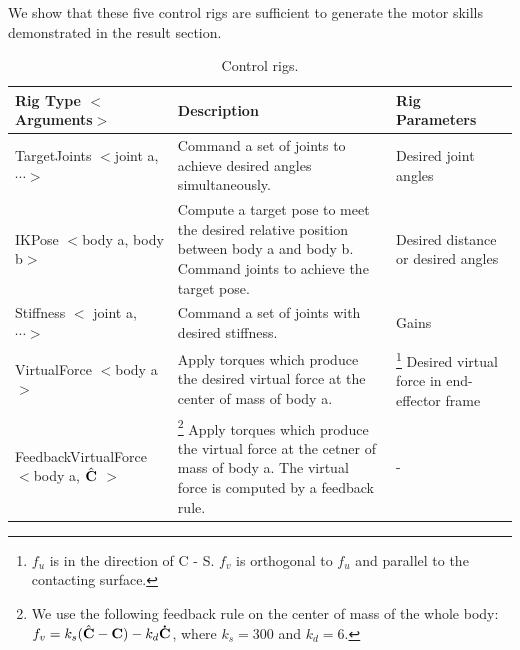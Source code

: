 We show that these five control rigs are sufficient to
generate the motor skills demonstrated in the result section.


\begin{table}
  \center
  \scriptsize
  \caption{Control rigs.     \hspace*{\fill} }
  \begin{minipage}{\textwidth}
  \begin{tabular}{ | l | p{5.8cm} | p{3.0cm} |}
    \hline
    \textbf{Rig Type $<$Arguments$>$}& \textbf{Description} & \textbf{Rig Parameters} \\ \hline
    TargetJoints $<$joint a, $\cdots>$ & Command a set of joints to achieve desired angles
    simultaneously. & Desired joint angles \\ \hline
    IKPose $<$body a, body b$>$ & Compute a target pose to meet the
    desired relative position
    between body a and body b. Command joints to achieve the
    target pose. & Desired distance or desired angles \\ \hline
    Stiffness $<$ joint a, $\cdots>$ & Command a set of joints with desired stiffness. & Gains \\ \hline
    VirtualForce $<$body a$>$ & Apply torques which produce the
    desired virtual force at the center of mass of body a. &
    \footnote{$f_u$ is  in the direction of C - S. $f_v$ is orthogonal to $f_u$
      and parallel to the contacting surface.}
    Desired virtual force in end-effector frame
    \\ \hline
    FeedbackVirtualForce $<$body a, 
    $\hat{\mathbf{C}}$ $>$ 
    & 
    \footnote{We use the following feedback rule on the center of mass
      of the whole body: $f_v = k_s(\hat{\mathbf{C}} - \mathbf{C}) -
      k_d\mathbf{\dot{C}}$, where $k_s = 300$ and $k_d = 6$.}
    Apply torques which produce the virtual force at the
    cetner of mass of body a. The virtual force is computed by a
    feedback rule.  & -
    \\ \hline 
  \end{tabular}
  \label{tab:parkour_rigs}
  \end{minipage}
\end{table}


